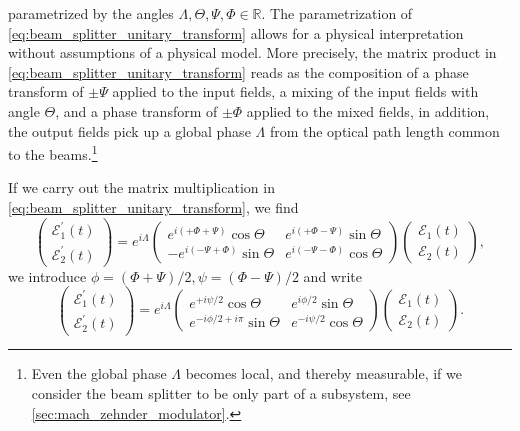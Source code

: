 parametrized by the angles $\Lambda,\Theta,\Psi,\Phi\in\mathbb{R}$.
The parametrization of \cref{eq:beam_splitter_unitary_transform} allows for a physical interpretation without assumptions of a physical model.
More precisely, the matrix product in \cref{eq:beam_splitter_unitary_transform} reads as the composition of a phase transform of $\pm\Psi$ applied to the input fields, a mixing of the input fields with angle $\Theta$, and a phase transform of $\pm\Phi$ applied to the mixed fields, in addition, the output fields pick up a global phase $\Lambda$ from the optical path length common to the beams.\footnote{Even the global phase $\Lambda$ becomes local, and thereby measurable, if we consider the beam splitter to be only part of a subsystem, see \cref{sec:mach_zehnder_modulator}.}

If we carry out the matrix multiplication in \cref{eq:beam_splitter_unitary_transform}, we find
\begin{equation}
    \begin{pmatrix}
        \mathcal{E}_1^\prime(t)
        \\
        \mathcal{E}_2^\prime(t)
    \end{pmatrix}
    =
    e^{i\Lambda}
    \begin{pmatrix}
        e^{i(+\Phi+\Psi)}\cos\Theta & e^{i(+\Phi-\Psi)}\sin\Theta
        \\
        -e^{i(-\Psi+\Phi)}\sin\Theta & e^{i(-\Psi-\Phi)}\cos\Theta
    \end{pmatrix}
    \begin{pmatrix}
        \mathcal{E}_1(t)
        \\
        \mathcal{E}_2(t)
    \end{pmatrix},
\end{equation}
we introduce $\phi=(\Phi+\Psi)/2,\psi=(\Phi-\Psi)/2$ and write
\begin{equation}
    \begin{pmatrix}
        \mathcal{E}_1^\prime(t)
        \\
        \mathcal{E}_2^\prime(t)
    \end{pmatrix}
    =
    e^{i\Lambda}
    \begin{pmatrix}
        e^{+i\psi/2}\cos\Theta & e^{i\phi/2}\sin\Theta
        \\
        e^{-i\phi/2+i\pi}\sin\Theta & e^{-i\psi/2}\cos\Theta
    \end{pmatrix}
    \begin{pmatrix}
        \mathcal{E}_1(t)
        \\
        \mathcal{E}_2(t)
    \end{pmatrix}
    \label{eq:beam_splitter_unitary_transform_expanded}.
\end{equation}
